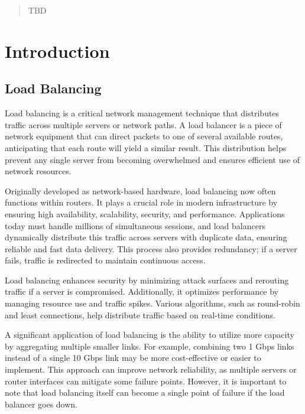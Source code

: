 \documentclass[12pt]{cwru_thesis}
\begin{document}
\printnomenclature

\begin{abstract}
  TBD
\end{abstract}

\mainmatter

\setcounter{secnumdepth}{2}

\chapter{Introduction} \label{chap:intro}
\section{Load Balancing} \label{sec:Loadsection}

Load balancing is a critical network management technique that distributes traffic across multiple servers or network paths. A load balancer is a piece of network equipment that can direct packets to one of several available routes, anticipating that each route will yield a similar result. This distribution helps prevent any single server from becoming overwhelmed and ensures efficient use of network resources.

Originally developed as network-based hardware, load balancing now often functions within routers. It plays a crucial role in modern infrastructure by ensuring high availability, scalability, security, and performance. Applications today must handle millions of simultaneous sessions, and load balancers dynamically distribute this traffic across servers with duplicate data, ensuring reliable and fast data delivery. This process also provides redundancy; if a server fails, traffic is redirected to maintain continuous access.

Load balancing enhances security by minimizing attack surfaces and rerouting traffic if a server is compromised. Additionally, it optimizes performance by managing resource use and traffic spikes. Various algorithms, such as round-robin and least connections, help distribute traffic based on real-time conditions.

A significant application of load balancing is the ability to utilize more capacity by aggregating multiple smaller links. For example, combining two 1 Gbps links instead of a single 10 Gbps link may be more cost-effective or easier to implement. This approach can improve network reliability, as multiple servers or router interfaces can mitigate some failure points. However, it is important to note that load balancing itself can become a single point of failure if the load balancer goes down.
\end{document}
